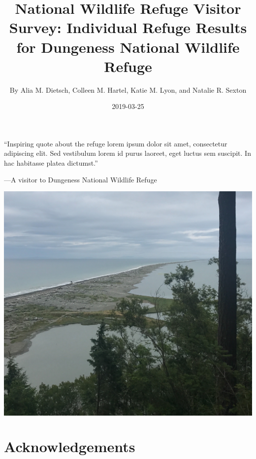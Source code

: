 \documentclass[]{book}
\title{National Wildlife Refuge Visitor Survey: Individual Refuge Results for
Dungeness National Wildlife Refuge}
\author{By Alia M. Dietsch, Colleen M. Hartel, Katie M. Lyon, and Natalie R.
Sexton}
\date{2019-03-25}
\begin{document}
\maketitle

{
\hypersetup{linkcolor=black}
\setcounter{tocdepth}{1}
\tableofcontents
}
\listoftables
\listoffigures
\chapter*{}\label{section}

``Inspiring quote about the refuge lorem ipsum dolor sit amet,
consectetur adipiscing elit. Sed vestibulum lorem id purus laoreet, eget
luctus sem suscipit. In hac habitasse platea dictumst.''

---A visitor to Dungeness National Wildlife Refuge

\begin{center}\includegraphics{refuge-info/Dungeness National Wildlife Refuge/cover} \end{center}

\chapter*{Acknowledgements}\label{acknowledgements}
\end{document}
